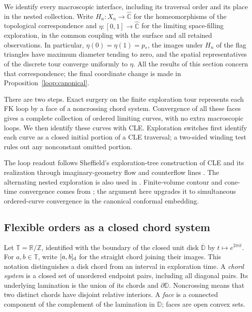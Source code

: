 \documentclass[11pt]{article}
\numberwithin{equation}{section}
\theoremstyle{definition}
\theoremstyle{remark}
\newcommand{\R}{\mathbb R}
\newcommand{\Z}{\mathbb Z}
\newcommand{\Chat}{\widehat{\mathbb C}}
\newcommand{\1}{\mathbf 1}
\begin{document}
We identify every macroscopic interface, including its traversal order
and its place in the nested collection.  Write $H_n:X_n\to\Chat$
for the homeomorphisms of the
topological correspondence and $\eta:[0,1]\to\Chat$ for the limiting
space-filling exploration, in the common coupling with the surface and
all retained observations.  In particular, $\eta(0)=\eta(1)=p_*$,
the images under $H_n$ of the flag triangles have maximum diameter tending
to zero, and the spatial representatives of the discrete tour converge
uniformly to $\eta$.  All the results of this section concern that
correspondence; the final coordinate change is made in
Proposition~\ref{loop:canonical}.

There are two steps.  Exact surgery on the finite exploration tour
represents each FK loop by a face of a noncrossing chord system.
Convergence of all these faces gives a complete collection of ordered
limiting curves, with no extra macroscopic loops.  We then identify
these curves with CLE.  Exploration switches first identify each curve
as a closed initial portion of a CLE traversal; a two-sided winding
test rules out any nonconstant omitted portion.

The loop readout follows Sheffield's exploration-tree construction of
CLE \cite{SheffieldExplorationTrees} and its realization through
imaginary-geometry flow and counterflow lines \cite{MillerSheffieldIGIV}.
The alternating nested exploration is also used in
\cite[Section~2.1.6]{AruHoldenPowellSunCritical}. Finite-volume contour and
cone-time convergence comes from \citet{GwynneSunFKIII}; the argument
here upgrades it to simultaneous ordered-curve convergence in the
canonical conformal embedding.

\subsection{Flexible orders as a closed chord system}

Let $\mathbb T=\R/\Z$, identified with the boundary of the closed unit disk
$\overline{\mathbb D}$ by $t\mapsto e^{2\pi it}$.  For $a,b\in\mathbb T$,
write $[a,b]_{\rm d}$ for the straight chord joining their images.  This
notation distinguishes a disk chord from an interval in exploration time.
A \emph{chord system} is a closed set of unordered endpoint pairs, including
all diagonal pairs.  Its underlying lamination is the union of its chords
and $\partial\mathbb D$.  Noncrossing means that two distinct chords have
disjoint relative interiors.  A \emph{face} is a connected component of the
complement of the lamination in $\mathbb D$; faces are open convex sets.
\end{document}
